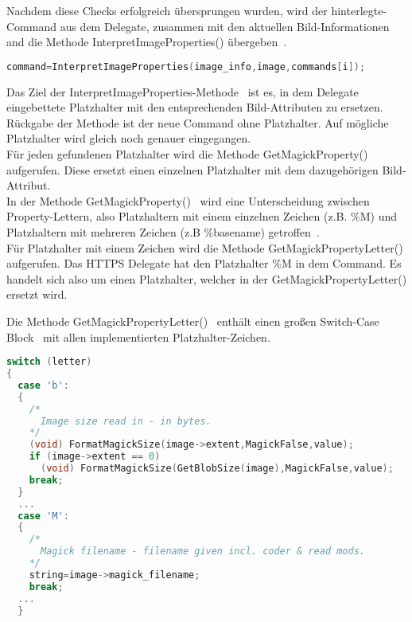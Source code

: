 Nachdem diese Checks erfolgreich übersprungen wurden, wird der hinterlegte-Command aus dem Delegate,
zusammen mit den aktuellen Bild-Informationen and die Methode InterpretImageProperties() übergeben~\cite{CallInterpretImageProperties}.

\begin{lstlisting}[firstnumber=1295, language=C, caption=magick/delegates.c InvokeDelegate() InterpretImageProperties() Aufruf,label={lst:delegatesinterpretcall}]
command=InterpretImageProperties(image_info,image,commands[i]);
\end{lstlisting}
\vspace{5mm}

Das Ziel der InterpretImageProperties-Methode~\cite{DeklarationInterpretImageProperties} ist es, in dem Delegate eingebettete Platzhalter mit den entsprechenden Bild-Attributen zu ersetzen.
Rückgabe der Methode ist der neue Command ohne Platzhalter.
Auf mögliche Platzhalter wird gleich noch genauer eingegangen.\\

Für jeden gefundenen Platzhalter wird die Methode GetMagickProperty()~\cite{CallGetMagickPrioerty} aufgerufen.
Diese ersetzt einen einzelnen Platzhalter mit dem dazugehörigen Bild-Attribut.\\

In der Methode GetMagickProperty()~\cite{DeklarationGetMagickProperty} wird eine Unterscheidung zwischen Property-Lettern,
also Platzhaltern mit einem einzelnen Zeichen (z.B. \%M) und Platzhaltern mit mehreren Zeichen (z.B \%basename) getroffen~\cite{UnterscheidungPropertyLetter}.\\

Für Platzhalter mit einem Zeichen wird die Methode GetMagickPropertyLetter() aufgerufen.
Das HTTPS Delegate hat den Platzhalter \%M in dem Command.
Es handelt sich also um einen Platzhalter, welcher in der GetMagickPropertyLetter() ersetzt wird.\\

\newpage

Die Methode GetMagickPropertyLetter()~\cite{DeklarationGetMgickPropertyLetter} enthält einen großen Switch-Case Block~\cite{SwitchBlock} mit allen implementierten Platzhalter-Zeichen.

\begin{lstlisting}[language=C, caption=magick/property.c GetMagickPropertyLetter Switch über mögliche Platzhalter,label={lst:propertyswitch}]
switch (letter)
{
  case 'b':
  {
    /*
      Image size read in - in bytes.
    */
    (void) FormatMagickSize(image->extent,MagickFalse,value);
    if (image->extent == 0)
      (void) FormatMagickSize(GetBlobSize(image),MagickFalse,value);
    break;
  }
  ...
  case 'M':
  {
    /*
      Magick filename - filename given incl. coder & read mods.
    */
    string=image->magick_filename;
    break;
  ...
  }
\end{lstlisting}
\vspace{5mm}

